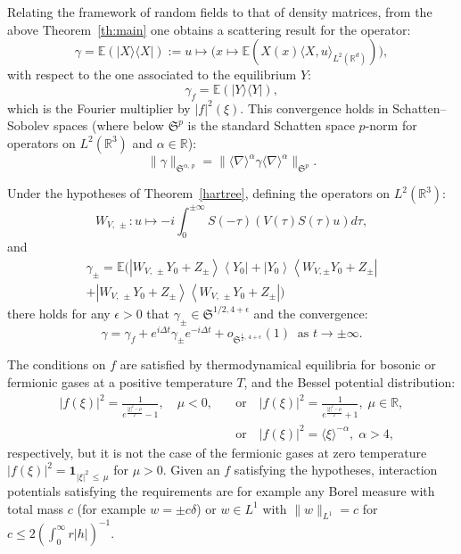 \documentclass[AHL, Unicode, longabstracts,published]{cedram}
\newcommand{\R}{\mathbb{R}}
\newcommand{\E}{\mathbb{E}}
\newcommand{\frkS}{\mathfrak{S}}
\newcommand{\bfun}{\mathbf{1}}
\begin{document}
Relating the framework of random fields to that of density matrices, from the above Theorem~\ref{th:main} one obtains a scattering result for the operator:
\begin{equation} \label{def:gamma}
\gamma =\E (|X\rangle \langle X|):= u \mapsto \Big(x\mapsto \E \left(X(x) \langle X,u\rangle_{L^2\left(\R^d\right)}\right)\Big),
\end{equation}
with respect to the one associated to the equilibrium $Y$:
\begin{equation} \label{def:gammaf}
\gamma_f= \E (|Y\rangle \langle Y |),
\end{equation}
which is the Fourier multiplier by $|f|^2(\xi)$. This convergence holds in Schatten--Sobolev spaces (where below $\frkS^p$ is the standard Schatten space $p$-norm for operators on $L^2(\R^3)$ and $\alpha\in\R$):
\[
\| \gamma \|_{\frkS^{\alpha,\,p}}=\| \langle \nabla \rangle^{\alpha} \gamma \langle \nabla \rangle^{\alpha} \|_{\frkS^p}.
\]


\begin{coro}\label{corollaire}

Under the hypotheses of Theorem~\ref{hartree}, defining the operators on $L^{2}(\R^3)$:
\begin{equation}\label{def:WVpm}
W_{V,\,\pm}:u\mapsto-i\int_0^{\pm \infty} S(-\tau) (V(\tau) S(\tau)u)d\tau,
\end{equation} and
\begin{multline}\label{def:gammapm}
\gamma_\pm= \E\big(\left|W_{V,\,\pm}Y_0+Z_{\pm}\right\rangle \left\langle Y_0\right|+\left|Y_0 \right\rangle \left\langle W_{V,\pm}Y_0+Z_\pm\right|\\
+\left|W_{V,\,\pm}Y_0+Z_{\pm}\right\rangle \left\langle W_{V,\,\pm}Y_0+Z_\pm \right|\big)
\end{multline}
there holds for any $\epsilon>0$ that $\gamma_\pm \in \frkS^{1/2,4+\epsilon}$ and the convergence:
\[
\gamma=\gamma_f+e^{i\Delta t}\gamma_\pm e^{-i \Delta t}+o_{\frkS^{\frac 12,\,4+\epsilon}}(1) \ \text{ as } t\rightarrow \pm \infty.
\]
\end{coro}


\begin{rema}
The conditions on $f$ are satisfied by thermodynamical equilibria for bosonic or fermionic gases at a positive temperature $T$, and the Bessel potential distribution:
\begin{align*}
|f(\xi)|^2=\frac{1}{e^{\frac{|\xi|^2-\mu}{T}}-1}, \quad \mu <0, \quad &\text{or} \quad |f(\xi)|^2=\frac{1}{e^{\frac{|\xi|^2-\mu}{T}}+1}, \; \mu\in \R, \\ &\text{or} \quad |f(\xi)|^2=\langle \xi \rangle^{-\alpha}, \; \alpha >4,
\end{align*}
respectively, but it is not the case of the fermionic gases at zero temperature $|f(\xi)|^2=\bfun_{|\xi|^2\,\leq\,\mu}$ for $\mu>0$. Given an $f$ satisfying the hypotheses, interaction potentials satisfying the requirements are for example any Borel measure with total mass $c$ (for example $w=\pm c\delta$) or $w\in L^1$ with $\| w\|_{L^1}=c$ for $c\leq 2(\int_0^\infty r|h|)^{-1}$.
\end{rema}
\end{document}
